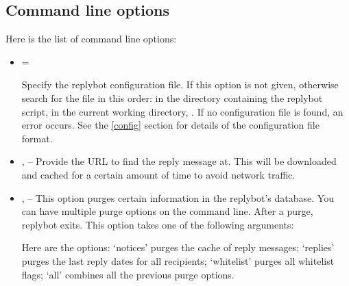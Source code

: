 \documentclass{howto}
\begin{document}
\subsection{Command line options}

Here is the list of command line options:

\begin{itemize}
\item {} 
      =

      Specify the replybot configuration file.  If this option is not given,
      otherwise search for the file in this order:  in the
      directory containing the replybot script,  in the
      current working directory, .  If no configuration file
      is found, an error occurs.  See the \ref{config} section for details of
      the configuration file format.

\item {},  -- Provide the URL to find
      the reply message at.  This will be downloaded and cached for a certain
      amount of time to avoid network traffic.

\item {},  -- This option purges
      certain information in the replybot's database.  You can have multiple
      purge options on the command line.  After a purge, replybot exits.  This
      option takes one of the following arguments:

      Here
      are the options: `notices' purges the cache of reply messages; `replies'
      purges the last reply dates for all recipients; `whitelist' purges all
      whitelist flags; `all' combines all the previous purge options.

\end{itemize}
\end{document}
